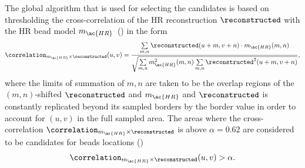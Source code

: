 The global algorithm that is used for selecting the candidates is based on thresholding the cross-correlation of the
    \ac{HR} reconstruction \(\reconstructed\) with the \ac{HR} bead model 
    \(m_{\ac{HR}}\)~() in the form
    \begin{equation*}
        \correlation_{m_{\ac{HR}} \times \reconstructed}(u,v) = 
        \frac{\sum\limits_{m,n}\reconstructed(u + m,v + n) \cdot m_{\ac{HR}}(m,n)}{\sqrt{\sum\limits_{m,n} m^2_{\ac{HR}}(m,n)
        \sum\limits_{m,n}\reconstructed^2(u + m,v + n)}},
    \end{equation*}
    where the limits of summation of \(m,n\) are taken to be the overlap regions of the \((m,n)\)-shifted 
    \(\reconstructed\) and \(m_{\ac{HR}}\) and \(\reconstructed\) is constantly replicated beyond its sampled borders by 
    the border value in order to account for \((u,v)\) in the full sampled
    area.
The areas where the cross-correlation \(\correlation_{m_{\ac{HR}} \times \reconstructed}\) is above \(\alpha = 0.62\) 
are considered to be candidates for beads locations ()
    \begin{equation*}
        \correlation_{m_{\ac{HR}} \times \reconstructed}(u,v) > \alpha.
    \end{equation*} %


\begin{marginfigure}[*-20]
    \caption{%
        The cross-correlation to establish the beads locations candidates.
        It is visible that some locations within the background are passed as candidates. 
        This is even more pronounced in the distal areas of the image near the edges.
    }
\end{marginfigure}


